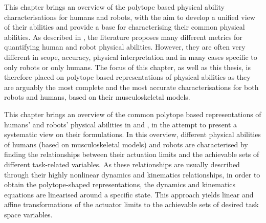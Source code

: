 This chapter brings an overview of the polytope based physical ability characterisations for humans and robots, with the aim to develop a unified view of their abilities and provide a base for characterising their common physical abilities. As described in , the literature proposes many different metrics for quantifying human and robot physical abilities. However, they are often very different in scope, accuracy, physical interpretation and in many cases specific to only robots or only humans. The focus of this chapter, as well as this thesis, is therefore placed on polytope based representations of physical abilities as they are arguably the most complete and the most accurate characterisations for both robots and humans, based on their musculoskeletal models.

This chapter brings an overview of the common polytope based representations of humans' and robots' physical abilities in  and , in the attempt to present a systematic view on their formulations. In this overview, different physical abilities of humans (based on musculoskeletal models) and robots are characterised by finding the relationships between their actuation limits and the achievable sets of different task-related variables. As these relationships are usually described through their highly nonlinear dynamics and kinematics relationships, in order to obtain the polytope-shaped representations, the dynamics and kinematics equations are linearised around a specific state. This approach yields linear and affine transformations of the actuator limits to the achievable sets of desired task space variables.

